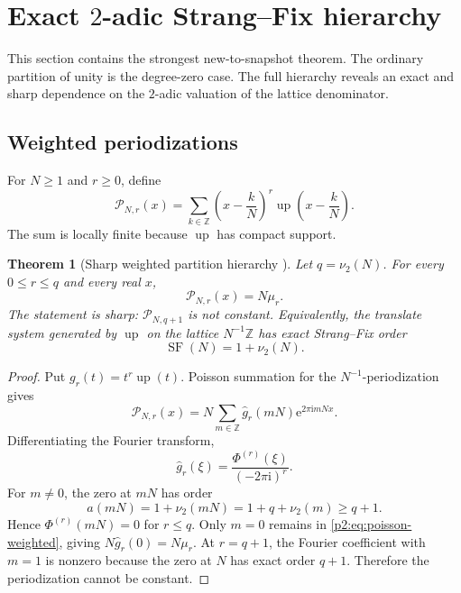 \documentclass[11pt]{article}
\numberwithin{equation}{section}
\newtheorem{theorem}{Theorem}[section]
\theoremstyle{definition}
\theoremstyle{remark}
\newcommand{\Z}{\mathbb Z}
\newcommand{\Up}{\operatorname{up}}
\newcommand{\e}{\mathrm e}
\newcommand{\ii}{\mathrm i}
\begin{document}
\section{Exact $2$-adic Strang--Fix hierarchy}
\label{p2:sec:weighted}

This section contains the strongest new-to-snapshot theorem.  The ordinary
partition of unity is the degree-zero case.  The full hierarchy reveals an exact
and sharp dependence on the $2$-adic valuation of the lattice denominator.

\subsection{Weighted periodizations}

For $N\ge1$ and $r\ge0$, define
\begin{equation}
 \mathcal P_{N,r}(x)=
 \sum_{k\in\Z}\left(x-\frac{k}{N}\right)^r
 \Up\!\left(x-\frac{k}{N}\right).                         \label{p2:eq:periodization}
\end{equation}
The sum is locally finite because $\Up$ has compact support.

\begin{theorem}[Sharp weighted partition hierarchy \NewResult]
\label{p2:thm:weighted}
Let $q=\nu_2(N)$.  For every $0\le r\le q$ and every real $x$,
\begin{equation}
 \boxed{\mathcal P_{N,r}(x)=N\mu_r.}                       \label{p2:eq:weighted-constant}
\end{equation}
The statement is sharp: $\mathcal P_{N,q+1}$ is not constant.  Equivalently, the
translate system generated by $\Up$ on the lattice $N^{-1}\Z$ has exact
Strang--Fix order
\begin{equation}
 \operatorname{SF}(N)=1+\nu_2(N).                          \label{p2:eq:SF-order}
\end{equation}
\end{theorem}

\begin{proof}
Put $g_r(t)=t^r\Up(t)$.  Poisson summation for the $N^{-1}$-periodization gives
\begin{equation}
 \mathcal P_{N,r}(x)=N\sum_{m\in\Z}
 \widehat g_r(mN)\e^{2\pi\ii mNx}.                        \label{p2:eq:poisson-weighted}
\end{equation}
Differentiating the Fourier transform,
\begin{equation}
 \widehat g_r(\xi)=\frac{\Phi^{(r)}(\xi)}{(-2\pi\ii)^r}.  \label{p2:eq:moment-fourier}
\end{equation}
For $m\ne0$, the zero at $mN$ has order
\[
 a(mN)=1+\nu_2(mN)=1+q+\nu_2(m)\ge q+1.
\]
Hence $\Phi^{(r)}(mN)=0$ for $r\le q$.  Only $m=0$ remains in
\eqref{p2:eq:poisson-weighted}, giving $N\widehat g_r(0)=N\mu_r$.
At $r=q+1$, the Fourier coefficient with $m=1$ is nonzero because the zero at
$N$ has exact order $q+1$.  Therefore the periodization cannot be constant.
\end{proof}
\end{document}

